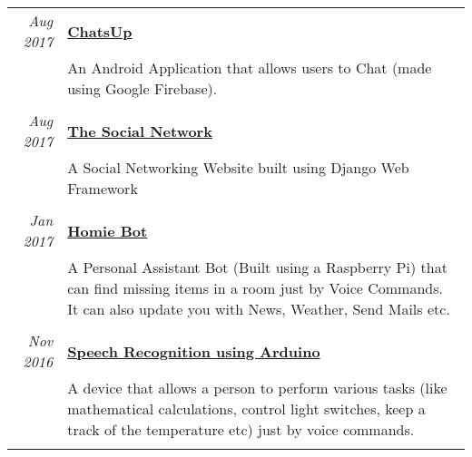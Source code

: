 \documentclass[a4paper,10pt]{article}
\begin{document}
\begin{tabular}{r|p{14.5cm}}
 \emph{Aug 2017} & \href{https://github.com/YashitM/ChatsUp}{\textbf{ChatsUp}} \\&\normalsize{An Android Application that allows users to Chat (made using Google Firebase).}\\\multicolumn{2}{c}{} \\ 
 \emph{Aug 2017} & \href{https://github.com/abhay-tyagi/Social_Network}{\textbf{The Social Network}} \\&\normalsize{A Social Networking Website built using Django Web Framework}\\\multicolumn{2}{c}{} \\
 \emph{Jan 2017} & \href{https://homiebot.yashitm.tech}{\textbf{Homie Bot}} \\&\normalsize{A Personal Assistant Bot (Built using a Raspberry Pi) that can find missing items in a room just by Voice Commands. It can also update you with News, Weather, Send Mails etc.}\\\multicolumn{2}{c}{} \\
 \emph{Nov 2016} & \href{https://github.com/YashitM/Arduino-Speech-Recog}{\textbf{Speech Recognition using Arduino}} \\&\normalsize{A device that allows a person to perform various tasks (like mathematical calculations, control light switches, keep a track of the temperature etc) just by voice commands.}\\\multicolumn{2}{c}{} \\
\end{tabular}

\end{document}
